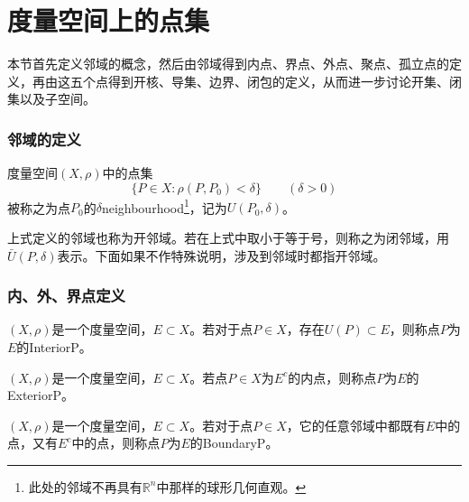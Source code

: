 \section{度量空间上的点集}
本节首先定义邻域的概念，然后由邻域得到内点、界点、外点、聚点、孤立点的定义，再由这五个点得到开核、导集、边界、闭包的定义，从而进一步讨论开集、闭集以及子空间。
\subsubsection{邻域的定义}
\begin{definition}
	度量空间$(X,\rho)$中的点集
	\begin{equation*}
		\{P\in X:\rho(P,P_0)<\delta\}\qquad (\delta>0)
	\end{equation*}
	被称之为点$P_0$的$\delta$\gls{neighbourhood}\footnote{此处的邻域不再具有$\mathbb{R}^n$中那样的球形几何直观。}，记为$U(P_0,\delta)$。
\end{definition}
上式定义的邻域也称为开邻域。若在上式中取小于等于号，则称之为闭邻域，用$\bar{U}(P,\delta)$表示。下面如果不作特殊说明，涉及到邻域时都指开邻域。
\subsubsection{内、外、界点定义}
\begin{definition}
	$(X,\rho)$是一个度量空间，$E\subset X$。若对于点$P\in X$，存在$U(P)\subset E$，则称点$P$为$E$的\gls{InteriorP}。
\end{definition}
\begin{definition}
	$(X,\rho)$是一个度量空间，$E\subset X$。若点$P\in X$为$E^c$的内点，则称点$P$为$E$的\gls{ExteriorP}。
\end{definition}
\begin{definition}
	$(X,\rho)$是一个度量空间，$E\subset X$。若对于点$P\in X$，它的任意邻域中都既有$E$中的点，又有$E^c$中的点，则称点$P$为$E$的\gls{BoundaryP}。
\end{definition}
